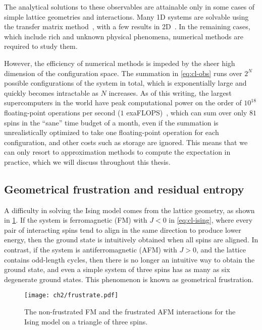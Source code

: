 The analytical solutions to these observables are attainable only in some cases of simple lattice geometries and interactions. Many 1D systems are solvable using the transfer matrix method~\cite{chaikin1995principles5}, with a few results in 2D~\cite{baxter1995solvable, march2016exactly, caravelli2022some}. In the remaining cases, which include rich and unknown physical phenomena, numerical methods are required to study them.

However, the efficiency of numerical methods is impeded by the sheer high dimension of the configuration space. The summation in \cref{eq:cl-obs} runs over $2^N$ possible configurations of the system in total, which is exponentially large and quickly becomes intractable as $N$ increases. As of this writing, the largest supercomputers in the world have peak computational power on the order of $10^{18}$ floating-point operations per second ($1$ exaFLOPS)~\cite{kogge2022frontier}, which can sum over only $81$ spins in the ``sane'' time budget of a month, even if the summation is unrealistically optimized to take one floating-point operation for each configuration, and other costs such as storage are ignored. This means that we can only resort to approximation methods to compute the expectation in practice, which we will discuss throughout this thesis.

\subsection{Geometrical frustration and residual entropy}
\label{sec:frustrate}

A difficulty in solving the Ising model comes from the lattice geometry, as shown in \cref{fig:frustrate}. If the system is ferromagnetic (FM) with $J < 0$ in \cref{eq:cl-ising}, where every pair of interacting spins tend to align in the same direction to produce lower energy, then the ground state is intuitively obtained when all spins are aligned. In contrast, if the system is antiferromagnetic (AFM) with $J > 0$, and the lattice contains odd-length cycles, then there is no longer an intuitive way to obtain the ground state, and even a simple system of three spins has as many as six degenerate ground states. This phenomenon is known as geometrical frustration.

\begin{figure}[htb]
\centering
\texttt{[image: ch2/frustrate.pdf]}
\caption[Frustrated interactions in Ising model]{
The non-frustrated FM and the frustrated AFM interactions for the Ising model on a triangle of three spins.
}
\label{fig:frustrate}
\end{figure}

